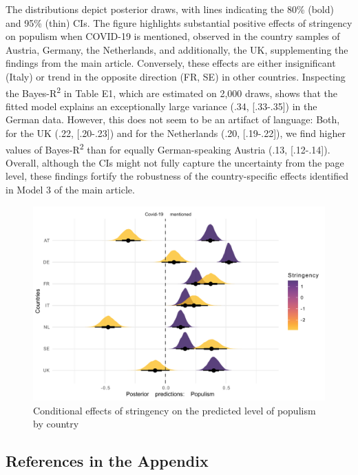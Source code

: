 \documentclass[
]{ccr}
\begin{document}
The distributions depict posterior draws, with lines indicating the 80\%
(bold) and 95\% (thin) CIs. The figure highlights substantial positive
effects of stringency on populism when COVID-19 is mentioned, observed
in the country samples of Austria, Germany, the Netherlands, and
additionally, the UK, supplementing the findings from the main article.
Conversely, these effects are either insignificant (Italy) or trend in
the opposite direction (FR, SE) in other countries. Inspecting the
Bayes-R\textsuperscript{2} in Table E1, which are estimated on 2,000
draws, shows that the fitted model explains an exceptionally large
variance (.34, {[}.33-.35{]}) in the German data. However, this does not
seem to be an artifact of language: Both, for the UK (.22,
{[}.20-.23{]}) and for the Netherlands (.20, {[}.19-.22{]}), we find
higher values of Bayes-R\textsuperscript{2} than for equally
German-speaking Austria (.13, {[}.12-.14{]}). Overall, although the CIs
might not fully capture the uncertainty from the page level, these
findings fortify the robustness of the country-specific effects
identified in Model 3 of the main article.

\begin{figure}

{\centering \includegraphics{plots/plot_strgXcov_SEP_ctry_fxdeff_20231130.pdf}

}

\caption{Conditional effects of stringency on the predicted level of
populism by country}

\end{figure}

\newpage

\hypertarget{references-in-the-appendix}{%
\subsection{References in the
Appendix}\label{references-in-the-appendix}}
\end{document}
